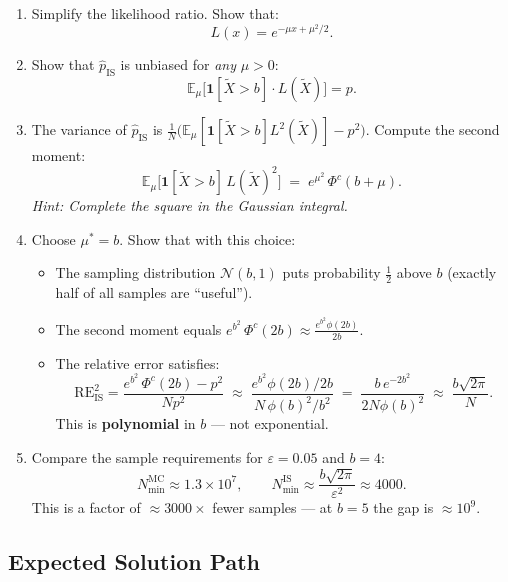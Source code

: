 \documentclass[12pt]{article}
\begin{document}
\begin{enumerate}[label=(\alph*)]

  \item Simplify the likelihood ratio.  Show that:
  \[
    L(x) = e^{-\mu x + \mu^2/2}.
  \]

  \item Show that $\hat{p}_{\mathrm{IS}}$ is unbiased for \emph{any} $\mu > 0$:
  \[
    \mathbb{E}_\mu\!\bigl[\mathbf{1}[\tilde{X}>b]\cdot L(\tilde{X})\bigr] = p.
  \]

  \item The variance of $\hat{p}_{\mathrm{IS}}$ is $\frac{1}{N}\bigl(\mathbb{E}_\mu[\mathbf{1}[\tilde{X}>b]L^2(\tilde{X})] - p^2\bigr)$.
  Compute the second moment:
  \[
    \mathbb{E}_\mu\!\bigl[\mathbf{1}[\tilde{X}>b]\,L(\tilde{X})^2\bigr]
    \;=\; e^{\mu^2}\,\Phi^c(b + \mu).
  \]
  \textit{Hint: Complete the square in the Gaussian integral.}

  \item Choose $\mu^* = b$.  Show that with this choice:
  \begin{itemize}
    \item The sampling distribution $\mathcal{N}(b,1)$ puts probability $\tfrac{1}{2}$ above $b$
      (exactly half of all samples are ``useful'').
    \item The second moment equals $e^{b^2}\,\Phi^c(2b) \approx \frac{e^{b^2}\phi(2b)}{2b}$.
    \item The relative error satisfies:
    \[
      \mathrm{RE}_{\mathrm{IS}}^2
      = \frac{e^{b^2}\,\Phi^c(2b) - p^2}{Np^2}
      \;\approx\; \frac{e^{b^2}\phi(2b)/2b}{N\,\phi(b)^2/b^2}
      \;=\; \frac{b\,e^{-2b^2}}{2N\phi(b)^2}
      \;\approx\; \frac{b\sqrt{2\pi}}{N}.
    \]
    This is \textbf{polynomial} in $b$ --- not exponential.
  \end{itemize}

  \item Compare the sample requirements for $\varepsilon = 0.05$ and $b = 4$:
  \[
    N^{\mathrm{MC}}_{\min} \approx 1.3 \times 10^7, \qquad
    N^{\mathrm{IS}}_{\min} \approx \frac{b\sqrt{2\pi}}{\varepsilon^2} \approx 4000.
  \]
  This is a factor of $\approx 3000\times$ fewer samples --- at $b = 5$ the gap is $\approx 10^9$.

\end{enumerate}

\subsection*{Expected Solution Path}
\end{document}
